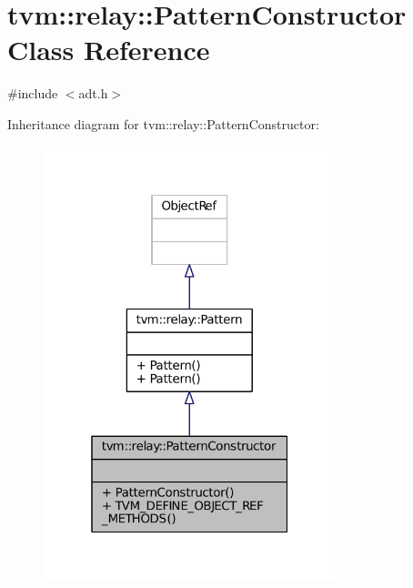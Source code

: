 \hypertarget{classtvm_1_1relay_1_1PatternConstructor}{}\section{tvm\+:\+:relay\+:\+:Pattern\+Constructor Class Reference}
\label{classtvm_1_1relay_1_1PatternConstructor}


{\ttfamily \#include $<$adt.\+h$>$}



Inheritance diagram for tvm\+:\+:relay\+:\+:Pattern\+Constructor\+:
\nopagebreak
\begin{figure}[H]
\begin{center}
\leavevmode
\includegraphics[width=241pt]{classtvm_1_1relay_1_1PatternConstructor__inherit__graph}
\end{center}
\end{figure}


